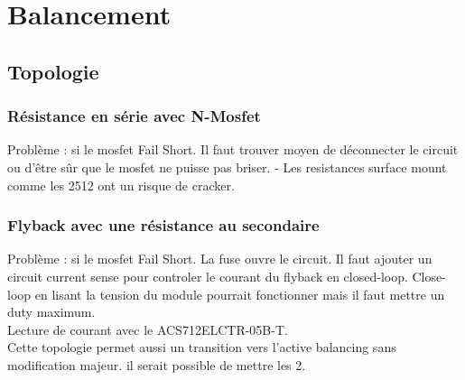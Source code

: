 

\section{Balancement}
	\subsection{Topologie}
		\subsubsection{Résistance en série avec N-Mosfet}
	Problème : si le mosfet Fail Short. Il faut trouver moyen de déconnecter le circuit ou d'être sûr que le mosfet ne puisse pas briser.
	- Les resistances surface mount comme les 2512 ont un risque de cracker.
		\subsubsection{Flyback avec une résistance au secondaire}
	Problème : si le mosfet Fail Short. La fuse ouvre le circuit. Il faut ajouter un circuit current sense pour controler le courant du flyback en closed-loop. Close-loop en lisant la tension du module pourrait fonctionner mais il faut mettre un duty maximum. 
	\\Lecture de courant avec le ACS712ELCTR-05B-T.  \\
	Cette topologie permet aussi un transition vers l'active balancing sans modification majeur. il serait possible de mettre les 2.

